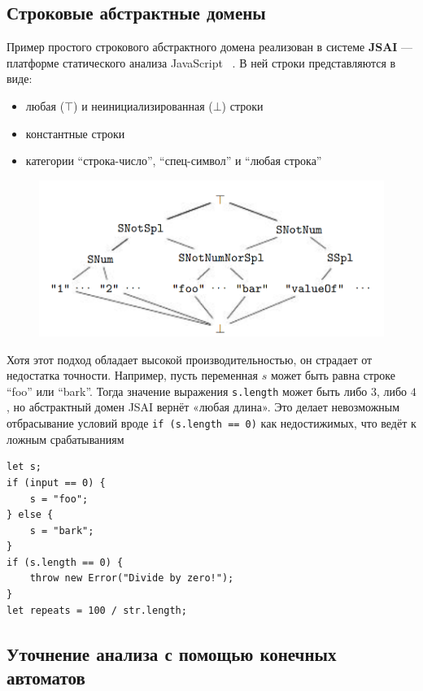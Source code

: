 \subsection{Строковые абстрактные домены}

Пример простого строкового абстрактного домена реализован в системе \textbf{JSAI} --- платформе статического анализа JavaScript ~\cite{guha2012jsai}. В ней строки представляются в виде:
\begin{itemize}
    \item любая ($\top$) и неинициализированная ($\bot$) строки
    \item константные строки
    \item категории ``строка-число'', ``спец-символ'' и ``любая строка''
\end{itemize}

\begin{figure}[H]
\includegraphics[width=\textwidth]{images/jsai-string-lattice.png}\hfill
\end{figure}


Хотя этот подход обладает высокой производительностью, он страдает от недостатка точности. Например, пусть переменная $s$ может быть равна строке ``foo'' или ``bark''. Тогда значение выражения \texttt{s.length} может быть либо $3$, либо $4$, но абстрактный домен JSAI вернёт «любая длина». Это делает невозможным отбрасывание условий вроде \texttt{if (s.length == 0)} как недостижимых, что ведёт к ложным срабатываниям

\newpage
\begin{lstlisting}[caption={Пример недостаточной точности в строковом домене JSAI}]
let s;
if (input == 0) {
    s = "foo";
} else {
    s = "bark";
}
if (s.length == 0) {
    throw new Error("Divide by zero!");
}
let repeats = 100 / str.length;
\end{lstlisting}




\newpage
\subsection{Уточнение анализа с помощью конечных автоматов}

